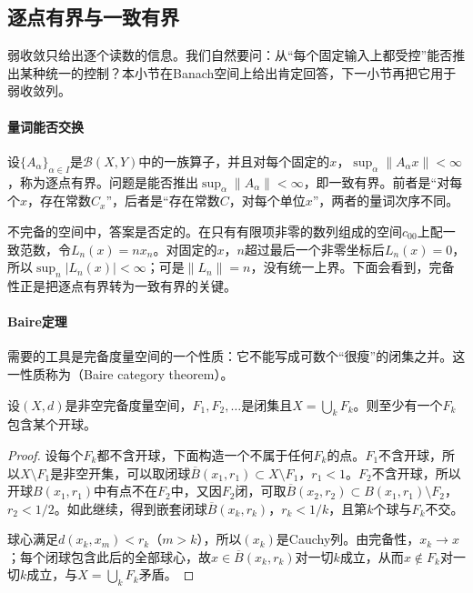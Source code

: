 \subsection{逐点有界与一致有界}
\label{sec:lfo-uniform-boundedness}

弱收敛只给出逐个读数的信息。我们自然要问：从“每个固定输入上都受控”能否推出某种统一的控制？本小节在Banach空间上给出肯定回答，下一小节再把它用于弱收敛列。

\paragraph{量词能否交换}
设$\{A_\alpha\}_{\alpha\in I}$是$\mathcal B(X,Y)$中的一族算子，并且对每个固定的$x$，$\sup_\alpha\|A_\alpha x\|<\infty$，称为逐点有界。问题是能否推出$\sup_\alpha\|A_\alpha\|<\infty$，即一致有界。前者是“对每个$x$，存在常数$C_x$”，后者是“存在常数$C$，对每个单位$x$”，两者的量词次序不同。

不完备的空间中，答案是否定的。在只有有限项非零的数列组成的空间$c_{00}$上配一致范数，令$L_n(x)=nx_n$。对固定的$x$，$n$超过最后一个非零坐标后$L_n(x)=0$，所以$\sup_n|L_n(x)|<\infty$；可是$\|L_n\|=n$，没有统一上界。下面会看到，完备性正是把逐点有界转为一致有界的关键。

\paragraph{Baire定理}
需要的工具是完备度量空间的一个性质：它不能写成可数个“很瘦”的闭集之并。这一性质称为（Baire category theorem）。

\begin{theorem}[Baire纲定理]
\label{thm:lfo-baire}
设$(X,d)$是非空完备度量空间，$F_1,F_2,\ldots$是闭集且$X=\bigcup_kF_k$。则至少有一个$F_k$包含某个开球。
\end{theorem}

\begin{proof}
设每个$F_k$都不含开球，下面构造一个不属于任何$F_k$的点。$F_1$不含开球，所以$X\setminus F_1$是非空开集，可以取闭球$\overline B(x_1,r_1)\subset X\setminus F_1$，$r_1<1$。$F_2$不含开球，所以开球$B(x_1,r_1)$中有点不在$F_2$中，又因$F_2$闭，可取$\overline B(x_2,r_2)\subset B(x_1,r_1)\setminus F_2$，$r_2<1/2$。如此继续，得到嵌套闭球$\overline B(x_k,r_k)$，$r_k<1/k$，且第$k$个球与$F_k$不交。

球心满足$d(x_k,x_m)<r_k$（$m>k$），所以$(x_k)$是Cauchy列。由完备性，$x_k\to x$；每个闭球包含此后的全部球心，故$x\in\overline B(x_k,r_k)$对一切$k$成立，从而$x\notin F_k$对一切$k$成立，与$X=\bigcup_kF_k$矛盾。
\end{proof}

